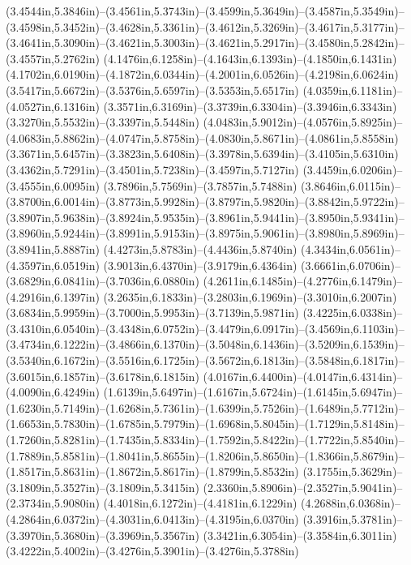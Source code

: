 (3.4544in,5.3846in)--(3.4561in,5.3743in)--(3.4599in,5.3649in)--(3.4587in,5.3549in)--(3.4598in,5.3452in)--(3.4628in,5.3361in)--(3.4612in,5.3269in)--(3.4617in,5.3177in)--(3.4641in,5.3090in)--(3.4621in,5.3003in)--(3.4621in,5.2917in)--(3.4580in,5.2842in)--(3.4557in,5.2762in) (4.1476in,6.1258in)--(4.1643in,6.1393in)--(4.1850in,6.1431in) (4.1702in,6.0190in)--(4.1872in,6.0344in)--(4.2001in,6.0526in)--(4.2198in,6.0624in) (3.5417in,5.6672in)--(3.5376in,5.6597in)--(3.5353in,5.6517in) (4.0359in,6.1181in)--(4.0527in,6.1316in) (3.3571in,6.3169in)--(3.3739in,6.3304in)--(3.3946in,6.3343in) (3.3270in,5.5532in)--(3.3397in,5.5448in) (4.0483in,5.9012in)--(4.0576in,5.8925in)--(4.0683in,5.8862in)--(4.0747in,5.8758in)--(4.0830in,5.8671in)--(4.0861in,5.8558in) (3.3671in,5.6457in)--(3.3823in,5.6408in)--(3.3978in,5.6394in)--(3.4105in,5.6310in) (3.4362in,5.7291in)--(3.4501in,5.7238in)--(3.4597in,5.7127in) (3.4459in,6.0206in)--(3.4555in,6.0095in) (3.7896in,5.7569in)--(3.7857in,5.7488in) (3.8646in,6.0115in)--(3.8700in,6.0014in)--(3.8773in,5.9928in)--(3.8797in,5.9820in)--(3.8842in,5.9722in)--(3.8907in,5.9638in)--(3.8924in,5.9535in)--(3.8961in,5.9441in)--(3.8950in,5.9341in)--(3.8960in,5.9244in)--(3.8991in,5.9153in)--(3.8975in,5.9061in)--(3.8980in,5.8969in)--(3.8941in,5.8887in) (4.4273in,5.8783in)--(4.4436in,5.8740in) (4.3434in,6.0561in)--(4.3597in,6.0519in) (3.9013in,6.4370in)--(3.9179in,6.4364in) (3.6661in,6.0706in)--(3.6829in,6.0841in)--(3.7036in,6.0880in) (4.2611in,6.1485in)--(4.2776in,6.1479in)--(4.2916in,6.1397in) (3.2635in,6.1833in)--(3.2803in,6.1969in)--(3.3010in,6.2007in) (3.6834in,5.9959in)--(3.7000in,5.9953in)--(3.7139in,5.9871in) (3.4225in,6.0338in)--(3.4310in,6.0540in)--(3.4348in,6.0752in)--(3.4479in,6.0917in)--(3.4569in,6.1103in)--(3.4734in,6.1222in)--(3.4866in,6.1370in)--(3.5048in,6.1436in)--(3.5209in,6.1539in)--(3.5340in,6.1672in)--(3.5516in,6.1725in)--(3.5672in,6.1813in)--(3.5848in,6.1817in)--(3.6015in,6.1857in)--(3.6178in,6.1815in) (4.0167in,6.4400in)--(4.0147in,6.4314in)--(4.0090in,6.4249in) (1.6139in,5.6497in)--(1.6167in,5.6724in)--(1.6145in,5.6947in)--(1.6230in,5.7149in)--(1.6268in,5.7361in)--(1.6399in,5.7526in)--(1.6489in,5.7712in)--(1.6653in,5.7830in)--(1.6785in,5.7979in)--(1.6968in,5.8045in)--(1.7129in,5.8148in)--(1.7260in,5.8281in)--(1.7435in,5.8334in)--(1.7592in,5.8422in)--(1.7722in,5.8540in)--(1.7889in,5.8581in)--(1.8041in,5.8655in)--(1.8206in,5.8650in)--(1.8366in,5.8679in)--(1.8517in,5.8631in)--(1.8672in,5.8617in)--(1.8799in,5.8532in) (3.1755in,5.3629in)--(3.1809in,5.3527in)--(3.1809in,5.3415in) (2.3360in,5.8906in)--(2.3527in,5.9041in)--(2.3734in,5.9080in) (4.4018in,6.1272in)--(4.4181in,6.1229in) (4.2688in,6.0368in)--(4.2864in,6.0372in)--(4.3031in,6.0413in)--(4.3195in,6.0370in) (3.3916in,5.3781in)--(3.3970in,5.3680in)--(3.3969in,5.3567in) (3.3421in,6.3054in)--(3.3584in,6.3011in) (3.4222in,5.4002in)--(3.4276in,5.3901in)--(3.4276in,5.3788in) 